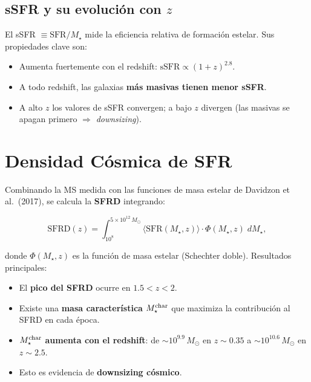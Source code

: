 \documentclass[12pt, a4paper]{article}
\begin{document}
\subsection{sSFR y su evolución con $z$}

El sSFR $\equiv \text{SFR}/M_\star$ mide la eficiencia relativa de formación
estelar. Sus propiedades clave son:

\begin{itemize}[leftmargin=2em]
    \item Aumenta fuertemente con el redshift: $\text{sSFR}\propto(1+z)^{2.8}$.
    \item A todo redshift, las galaxias \textbf{más masivas tienen menor sSFR}.
    \item A alto $z$ los valores de sSFR convergen; a bajo $z$ divergen
          (las masivas se apagan primero $\Rightarrow$ \textit{downsizing}).
\end{itemize}

\section{Densidad Cósmica de SFR}

Combinando la MS medida con las funciones de masa estelar de Davidzon et al.\ (2017),
se calcula la \textbf{SFRD} integrando:

\begin{equation}
    \text{SFRD}(z) = \int_{10^8}^{5\times10^{12}\,M_\odot}
    \langle\text{SFR}(M_\star,z)\rangle \cdot \Phi(M_\star,z)\;dM_\star,
    \label{eq:sfrd}
\end{equation}

donde $\Phi(M_\star,z)$ es la función de masa estelar (Schechter doble).
Resultados principales:

\begin{itemize}[leftmargin=2em]
    \item El \textbf{pico del SFRD} ocurre en $1.5 < z < 2$.
    \item Existe una \textbf{masa característica} $M_\star^{\rm char}$ que
          maximiza la contribución al SFRD en cada época.
    \item $M_\star^{\rm char}$ \textbf{aumenta con el redshift}:
          de $\sim10^{9.9}\,M_\odot$ en $z\sim0.35$ a
          $\sim10^{10.6}\,M_\odot$ en $z\sim2.5$.
    \item Esto es evidencia de \textbf{downsizing cósmico}.
\end{itemize}
\end{document}
